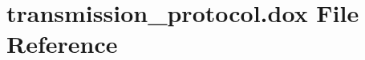 \hypertarget{transmission__protocol_8dox}{}\section{transmission\+\_\+protocol.\+dox File Reference}
\label{transmission__protocol_8dox}

